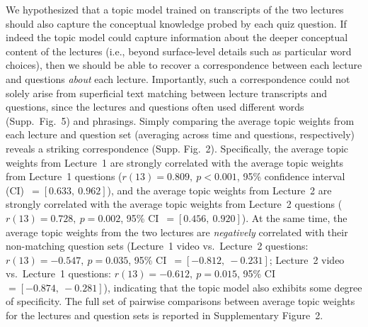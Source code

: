 \documentclass[10pt]{article}
\newcommand{\topicWeights}{2}
\newcommand{\jaccard}{5}
\begin{document}
We hypothesized that a topic model trained on transcripts of the two lectures
should also capture the conceptual knowledge probed by each quiz question. If
indeed the topic model could capture information about the deeper conceptual
content of the lectures (i.e., beyond surface-level details such as particular
word choices), then we should be able to recover a correspondence between each
lecture and questions \textit{about} each lecture. Importantly, such a
correspondence could not solely arise from superficial text matching between
lecture transcripts and questions, since the lectures and questions often used
different words (Supp.~Fig.~\jaccard) and phrasings. Simply comparing the
average topic weights from each lecture and question set (averaging across time
and questions, respectively) reveals a striking correspondence (Supp.
Fig.~\topicWeights). Specifically, the average topic weights from Lecture~1 are
strongly correlated with the average topic weights from Lecture~1 questions
($r(13) = 0.809,~p < 0.001$, 95\% confidence interval (CI)~$= [0.633,~0.962]$),
and the average topic weights from Lecture~2 are strongly correlated with the
average topic weights from Lecture~2 questions ($r(13) = 0.728,~p = 0.002$,
95\% CI~$= [0.456,~0.920]$). At the same time, the average topic weights from
the two lectures are \textit{negatively} correlated with their non-matching
question sets (Lecture~1 video vs.~Lecture~2 questions: $r(13) = -0.547,~p =
0.035$, 95\% CI~$= [-0.812, ~-0.231]$; Lecture~2 video vs.~Lecture~1 questions:
$r(13) = -0.612,~p = 0.015$, 95\% CI~$= [-0.874,~-0.281]$), indicating that the
topic model also exhibits some degree of specificity. The full set of pairwise
comparisons between average topic weights for the lectures and question sets is
reported in Supplementary Figure~\topicWeights.
\end{document}

